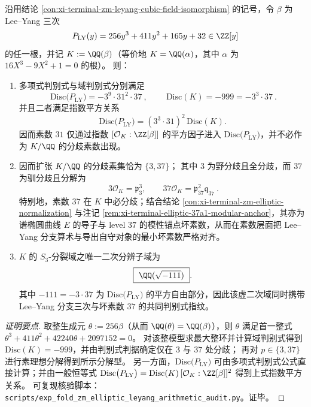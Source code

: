 \begin{conclusion}\label{con:xi-terminal-zm-leyang-cubic-field-minimal-discriminant}
沿用结论 \ref{con:xi-terminal-zm-leyang-cubic-field-isomorphism} 的记号，令 \(\beta\) 为 Lee--Yang 三次
\[
P_{\mathrm{LY}}(y)=256y^{3}+411y^{2}+165y+32\in\ZZ[y]
\]
的任一根，并记 \(K:=\QQ(\beta)\)（等价地 \(K=\QQ(\alpha)\)，其中 \(\alpha\) 为 \(16X^{3}-9X^{2}+1=0\) 的根）。
则：
\begin{enumerate}
  \item 多项式判别式与域判别式分别满足
  \[
  \boxed{\ \mathrm{Disc}\bigl(P_{\mathrm{LY}}\bigr)=-3^{9}\cdot 31^{2}\cdot 37\ },
  \qquad
  \boxed{\ \mathrm{Disc}(K)=-999=-3^{3}\cdot 37\ }.
  \]
  并且二者满足指数平方关系
  \[
  \mathrm{Disc}\bigl(P_{\mathrm{LY}}\bigr)=(3^{3}\cdot 31)^2\,\mathrm{Disc}(K).
  \]
  因而素数 \(31\) 仅通过指数 \([\mathcal O_K:\ZZ[\beta]]\) 的平方因子进入 \(\mathrm{Disc}\bigl(P_{\mathrm{LY}}\bigr)\)，并不必作为 \(K/\QQ\) 的分歧素数出现。
  \item 因而扩张 \(K/\QQ\) 的分歧素集恰为 \(\{3,37\}\)；
  其中 \(3\) 为野分歧且全分歧，而 \(37\) 为驯分歧且分解为
  \[
  \boxed{\ 3\mathcal O_K=\mathfrak p_3^{3},\qquad 37\mathcal O_K=\mathfrak p_{37}^{2}\mathfrak q_{37}\ }.
  \]
  特别地，素数 \(37\) 在 \(K\) 中必分歧；结合结论 \ref{con:xi-terminal-zm-elliptic-normalization} 与注记 \ref{rem:xi-terminal-elliptic-37a1-modular-anchor}，其亦为谱椭圆曲线 \(E\) 的导子与 level \(37\) 的模性锚点坏素数，从而在素数层面把 Lee--Yang 分支算术与导出自守对象的最小坏素数严格对齐。
  \item \(K\) 的 \(S_3\)-分裂域之唯一二次分辨子域为
  \[
  \boxed{\ \QQ(\sqrt{-111})\ }.
  \]
  其中 \(-111=-3\cdot 37\) 为 \(\mathrm{Disc}\bigl(P_{\mathrm{LY}}\bigr)\) 的平方自由部分，因此该虚二次域同时携带 Lee--Yang 分支三次与坏素数 \(37\) 的共同判别式指纹。
\end{enumerate}
\end{conclusion}
\begin{proof}[证明要点]
取整生成元 \(\theta:=256\beta\)（从而 \(\QQ(\theta)=\QQ(\beta)\)），则 \(\theta\) 满足首一整式
\(
\theta^{3}+411\theta^{2}+42240\theta+2097152=0
\)。
对该整模型求最大整环并计算域判别式得到 \(\mathrm{Disc}(K)=-999\)，并由判别式判据确定仅在 \(3\) 与 \(37\) 处分歧；
再对 \(p\in\{3,37\}\) 进行素理想分解得到所示分解型。
另一方面，\(\mathrm{Disc}\bigl(P_{\mathrm{LY}}\bigr)\) 可由多项式判别式公式直接计算；并由一般恒等式 \(\mathrm{Disc}\bigl(P_{\mathrm{LY}}\bigr)=\mathrm{Disc}(K)\,[\mathcal O_K:\ZZ[\beta]]^{2}\) 得到上式指数平方关系。
可复现核验脚本：\texttt{scripts/exp\_fold\_zm\_elliptic\_leyang\_arithmetic\_audit.py}。证毕。
\end{proof}

